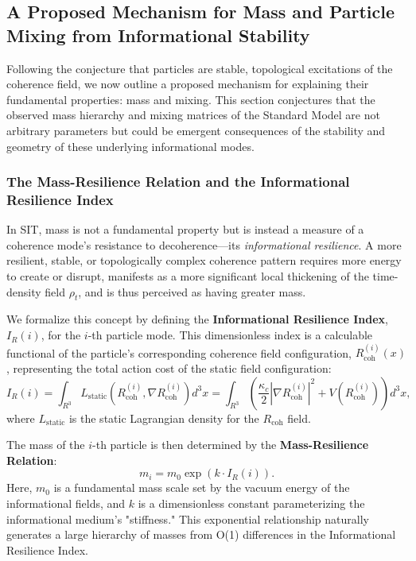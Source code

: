 \documentclass[american,11pt,letterpaper]{article}
\def\mathbb#1{#1}%
\def\mathcal#1{#1}%
\begin{document}
\subsection{A Proposed Mechanism for Mass and Particle Mixing from Informational Stability}

Following the conjecture that particles are stable, topological excitations of the coherence field, we now outline a proposed mechanism for explaining their fundamental properties: mass and mixing. This section conjectures that the observed mass hierarchy and mixing matrices of the Standard Model are not arbitrary parameters but could be emergent consequences of the stability and geometry of these underlying informational modes.

\subsubsection{The Mass-Resilience Relation and the Informational Resilience Index}

In SIT, mass is not a fundamental property but is instead a measure of a coherence mode's resistance to decoherence---its \textit{informational resilience}. A more resilient, stable, or topologically complex coherence pattern requires more energy to create or disrupt, manifests as a more significant local thickening of the time-density field $\rho_t$, and is thus perceived as having greater mass.

We formalize this concept by defining the \textbf{Informational Resilience Index}, $I_R(i)$, for the $i$-th particle mode. This dimensionless index is a calculable functional of the particle's corresponding coherence field configuration, $R_{\text{coh}}^{(i)}(x)$, representing the total action cost of the static field configuration:
\begin{equation}
    I_R(i) = \int_{\mathbb{R}^3} \mathcal{L}_{\text{static}}\left( R_{\text{coh}}^{(i)}, \nabla R_{\text{coh}}^{(i)} \right) d^3x = \int_{\mathbb{R}^3} \left( \frac{\kappa_c}{2} |\nabla R_{\text{coh}}^{(i)}|^2 + V(R_{\text{coh}}^{(i)}) \right) d^3x,
    \label{eq:resilience_index_consolidated}
\end{equation}
where $\mathcal{L}_{\text{static}}$ is the static Lagrangian density for the $R_{\text{coh}}$ field.

The mass of the $i$-th particle is then determined by the \textbf{Mass-Resilience Relation}:
\begin{equation}
    m_i = m_0 \exp(k \cdot I_R(i)).
    \label{eq:mass_resilience_relation_consolidated}
\end{equation}
Here, $m_0$ is a fundamental mass scale set by the vacuum energy of the informational fields, and $k$ is a dimensionless constant parameterizing the informational medium's "stiffness." This exponential relationship naturally generates a large hierarchy of masses from O(1) differences in the Informational Resilience Index.
\end{document}
